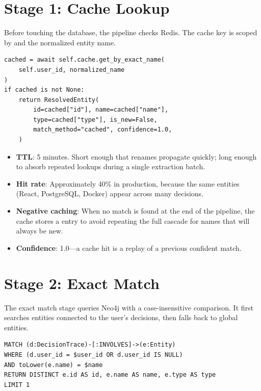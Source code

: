 \section{Stage 1: Cache Lookup}
\label{sec:er-cache}

Before touching the database, the pipeline checks Redis.  The cache key is
scoped by  and the normalized entity name.

\begin{lstlisting}[style=python, caption={Cache lookup (simplified from \codefile{entity\_resolver.py}).}]
cached = await self.cache.get_by_exact_name(
    self.user_id, normalized_name
)
if cached is not None:
    return ResolvedEntity(
        id=cached["id"], name=cached["name"],
        type=cached["type"], is_new=False,
        match_method="cached", confidence=1.0,
    )
\end{lstlisting}

\begin{itemize}
    \item \textbf{TTL}: 5 minutes.  Short enough that renames propagate
          quickly; long enough to absorb repeated lookups during a single
          extraction batch.
    \item \textbf{Hit rate}: Approximately 40\% in production, because
          the same entities (React, PostgreSQL, Docker) appear across many
          decisions.
    \item \textbf{Negative caching}: When no match is found at the end
          of the pipeline, the cache stores a  entry to avoid
          repeating the full cascade for names that will always be new.
    \item \textbf{Confidence}: 1.0---a cache hit is a replay of a previous
          confident match.
\end{itemize}


\section{Stage 2: Exact Match}
\label{sec:er-exact}

The exact match stage queries Neo4j with a case-insensitive comparison.
It first searches entities connected to the user's decisions, then falls
back to global entities.

\begin{lstlisting}[style=cypher, caption={Exact match query (user-scoped).}]
MATCH (d:DecisionTrace)-[:INVOLVES]->(e:Entity)
WHERE (d.user_id = $user_id OR d.user_id IS NULL)
AND toLower(e.name) = $name
RETURN DISTINCT e.id AS id, e.name AS name, e.type AS type
LIMIT 1
\end{lstlisting}

